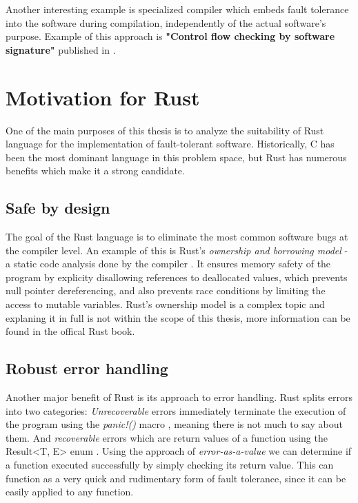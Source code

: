 \documentclass[12pt, letterpaper]{article}
\begin{document}
Another interesting example is specialized compiler which embeds fault tolerance into the software during compilation, independently of the actual software's purpose. Example of this approach is \textbf{"Control flow checking by software signature"} published in \cite{994926}.

\newpage

\section{Motivation for Rust}
One of the main purposes of this thesis is to analyze the suitability of Rust language for the implementation of fault-tolerant software. Historically, C has been the most dominant language in this problem space, but Rust has numerous benefits which make it a strong candidate.

\subsection{Safe by design}
The goal of the Rust language is to eliminate the most common software bugs at the compiler level. An example of this is Rust's \textit{ownership and borrowing model} - a static code analysis done by the compiler \cite{rust_book:ownership}. It ensures memory safety of the program by explicity disallowing references to deallocated values, which prevents null pointer dereferencing, and also prevents race conditions by limiting the access to mutable variables. Rust's ownership model is a complex topic and explaning it in full is not within the scope of this thesis, more information can be found in the offical Rust book.

\subsection{Robust error handling}
Another major benefit of Rust is its approach to error handling. Rust splits errors into two categories: \textit{Unrecoverable} errors immediately terminate the execution of the program using the \textit{panic!()} macro \cite{rust_book:panic}, meaning there is not much to say about them. And \textit{recoverable} errors which are return values of a function using the Result<T, E> enum \cite{rust_book:result}. Using the approach of \textit{error-as-a-value} we can determine if a function executed successfully by simply checking its return value. This can function as a very quick and rudimentary form of fault tolerance, since it can be easily applied to any function.
\end{document}
